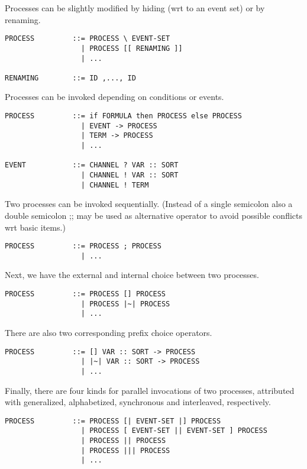 \documentclass{article}
\begin{document}
Processes can be slightly modified by hiding (wrt to an event set) or by
renaming.

\begin{verbatim}
PROCESS         ::= PROCESS \ EVENT-SET
                  | PROCESS [[ RENAMING ]]
                  | ...

RENAMING        ::= ID ,..., ID
\end{verbatim}

Processes can be invoked depending on conditions or events.

\begin{verbatim}
PROCESS         ::= if FORMULA then PROCESS else PROCESS
                  | EVENT -> PROCESS
                  | TERM -> PROCESS
                  | ...

EVENT           ::= CHANNEL ? VAR :: SORT
                  | CHANNEL ! VAR :: SORT
                  | CHANNEL ! TERM
\end{verbatim}

Two processes can be invoked sequentially. (Instead of a single semicolon also
a double semicolon ;; may be used as alternative operator to avoid possible
conflicts wrt basic items.)

\begin{verbatim}
PROCESS         ::= PROCESS ; PROCESS
                  | ...
\end{verbatim}

Next, we have the external and internal choice between two processes.

\begin{verbatim}
PROCESS         ::= PROCESS [] PROCESS
                  | PROCESS |~| PROCESS
                  | ...
\end{verbatim}

There are also two corresponding prefix choice operators.
\begin{verbatim}
PROCESS         ::= [] VAR :: SORT -> PROCESS
                  | |~| VAR :: SORT -> PROCESS
                  | ...
\end{verbatim}

Finally, there are four kinds for parallel invocations of two processes,
attributed with generalized, alphabetized, synchronous and interleaved,
respectively.

\begin{verbatim}
PROCESS         ::= PROCESS [| EVENT-SET |] PROCESS
                  | PROCESS [ EVENT-SET || EVENT-SET ] PROCESS
                  | PROCESS || PROCESS
                  | PROCESS ||| PROCESS
                  | ...
\end{verbatim}
\end{document}
